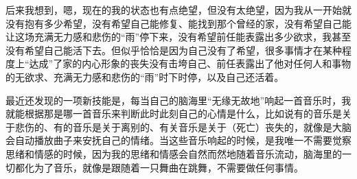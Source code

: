 后来我想到，嗯，现在的我的状态也有点绝望，但没有太绝望，因为我从一开始就没有抱有多少希望，没有希望自己能修复、能找到那个曾经的家，没有希望自己能让这场充满无力感和悲伤的“雨”停下来，没有希望前任能表露出多少欲求，我甚至没有希望自己能活下去。但似乎恰恰是因为自己没有了希望，很多事情才在某种程度上“达成”了\pozhehao{}家的内心形象的丧失没有击垮自己、前任表露出了他对任何人和事物的无欲求、充满无力感和悲伤的“雨”时下时停，以及自己还活着。

最近还发现的一项新技能是，每当自己的脑海里“无缘无故地”响起一首音乐时，我就能根据那是哪一首音乐来判断此时此刻自己的心情是什么，比如说有的音乐是关于悲伤的、有的音乐是关于离别的、有关音乐是关于（死亡）丧失的，就像是大脑会自动播放曲子来安抚自己的情绪。当这些音乐响起的时候，是我唯一不需要觉察思绪和情感的时候，因为我的思绪和情感会自然而然地随着音乐流动，脑海里的一切都化为了音乐，就像是跟随着一只舞曲在跳舞，不需要做任何事情。

\noindent\begin{minipage}{\linewidth}
	\center

	\noindent{}
        \vspace{8pt}

	\noindent{}
        \vspace{8pt}

	\noindent{}


\end{minipage}






